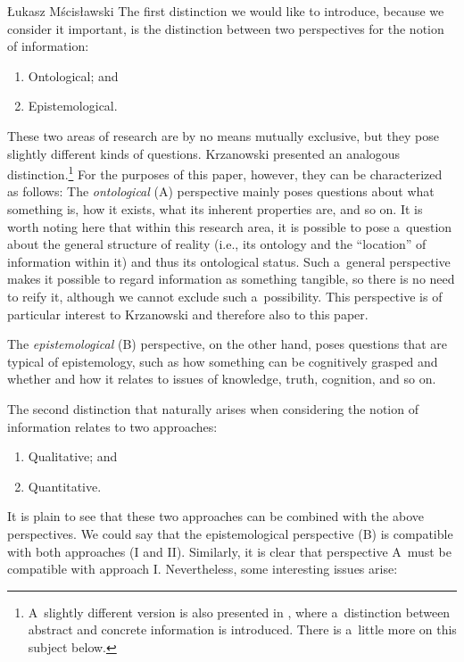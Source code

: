 \begin{artengenv}{Łukasz Mścisławski}
The first distinction we would like to introduce, because we consider it important, is the distinction between two perspectives for the notion of information:
\begin{enumerate}[label=(\Alph*)]
\item Ontological; and
\item Epistemological.
\end{enumerate}
These two areas of research are by no means mutually exclusive, but they pose slightly different kinds of questions. Krzanowski
\parencites*[][pp.37–38]{krzanowski_why_2020}[][pp.123–151]{krzanowski_ontological_2022} %
 presented an analogous distinction.\footnote{A~slightly different version is also presented in 
\parencite[][]{krzanowski_what_2020}, %
 where a~distinction between abstract and concrete information is introduced. There is a~little more on this subject below.}
 For the purposes of this paper, however, they can be characterized as follows: The \textit{ontological} (A) perspective mainly poses questions about what something is, how it exists, what its inherent properties are, and so on. It is worth noting here that within this research area, it is possible to pose a~question about the general structure of reality (i.e., its ontology and the ``location'' of information within it) and thus its ontological status. Such a~general perspective makes it possible to regard information as something tangible, so there is no need to reify it, although we cannot exclude such a~possibility. This perspective is of particular interest to Krzanowski and therefore also to this paper.


The \textit{epistemological} (B) perspective, on the other hand, poses questions that are typical of epistemology, such as how something can be cognitively grasped and whether and how it relates to issues of knowledge, truth, cognition, and so on.

The second distinction that naturally arises when considering the notion of information relates to two approaches:
\begin{enumerate}[label=(\Roman*)]
\item Qualitative; and
\item Quantitative.
\end{enumerate}
It is plain to see that these two approaches can be combined with the above perspectives. We could say that the epistemological perspective (B) is compatible with both approaches (I and II). Similarly, it is clear that perspective A~must be compatible with approach I. Nevertheless, some interesting issues arise:


\end{artengenv}
